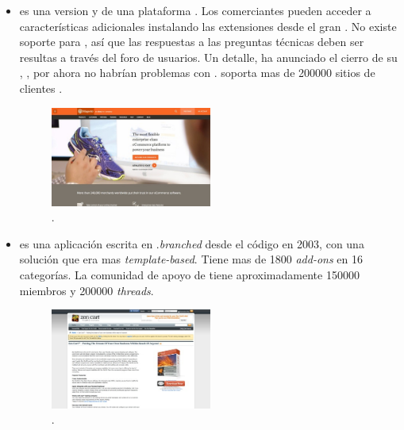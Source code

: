 \begin{itemize}
	\item \textbf{\nameMagento \Community \Edition} es una version \free y \opensource de  una plataforma \ecommerce. Los comerciantes pueden acceder a características adicionales instalando las extensiones desde el gran \nameMagento \connectCustom \marketplace. No existe soporte para \nameMagento \Community \Edition, así que las respuestas a las preguntas técnicas deben ser resultas a través del foro de usuarios. Un detalle, \nameMagento ha anunciado el cierro de su \hosted \solution, \nameMagento \go, por ahora no habrían problemas con \Community \Edition. \nameMagento \Community \Edition soporta mas de 200000 sitios de clientes .

	\begin{figure}[H]
		\centering
		\includegraphics[width=0.5\textwidth]{figuras/cap1/MagentoWebsite.jpg}
		\caption{\nameMagento \website \cite{online_Magento}.}
	\end{figure}


	\item \textbf{\nameZenCart} es una aplicación \ecommerce \opensource escrita en \php.\nameZenCart \textit{branched} desde el código \nameOsCommerce en 2003, con una solución que era mas \textit{template-based}. Tiene mas de 1800 \textit{add-ons} en 16 categorías. La comunidad de apoyo de \nameZenCart tiene aproximadamente 150000 miembros y 200000 \textit{threads}.

	\begin{figure}[H]
		\centering
		\includegraphics[width=0.5\textwidth]{figuras/cap1/ZenCartWebsite.jpg}
		\caption{\nameZenCart \website \cite{online_ZenCart}.}
	\end{figure}



\end{itemize}
